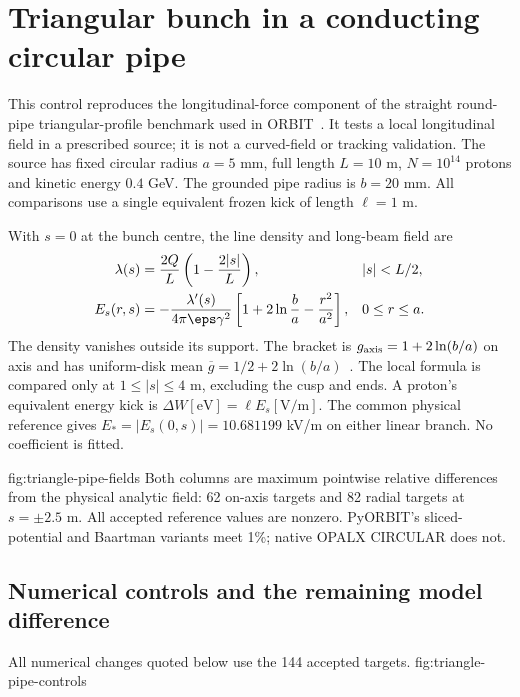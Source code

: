 \clearpage
\section{Triangular bunch in a conducting circular pipe}
\label{sec:triangle-pipe}
This control reproduces the longitudinal-force component of the straight
round-pipe triangular-profile benchmark used in ORBIT~\cite{orbit2006,pyorbit3triangle}. It tests a local
longitudinal field in a prescribed source; it is not a curved-field or tracking
validation. The source has fixed circular radius $a=5$ mm, full length
$L=10$ m, $N=10^{14}$ protons and kinetic energy $0.4$ GeV. The grounded
pipe radius is $b=20$ mm. All comparisons use a single equivalent frozen
kick of length $\ell=1$ m.

With $s=0$ at the bunch centre, the line density and long-beam field are
\begin{align}
 \lambda(s)&=\frac{2Q}{L}\left(1-\frac{2|s|}{L}\right),
   &&|s|<L/2,\\
 E_s(r,s)&=-\frac{\lambda'(s)}{4\pi\eps\gamma^2}
 \left[1+2\ln\frac ba-\frac{r^2}{a^2}\right],
   &&0\le r\le a.
 \label{eq:triangle-pipe}
\end{align}
The density vanishes outside its support. The bracket is $g_{\rm axis}
=1+2\ln(b/a)$ on axis and has uniform-disk mean
$\overline g=1/2+2\ln(b/a)$~\cite{baartman}. The local formula is compared
only at $1\le|s|\le4$ m, excluding the cusp and ends. A proton's equivalent
energy kick is $\Delta W[\mathrm{eV}]=\ell E_s[\mathrm{V/m}]$.
The common physical reference gives $E_*=|E_s(0,s)|=10.681199$ kV/m on
either linear branch. No coefficient is fitted.

{fig:triangle-pipe-fields}
Both columns are maximum pointwise relative differences from the physical
analytic field: 62 on-axis targets and 82 radial targets at $s=\pm2.5$ m.
All accepted reference values are nonzero. PyORBIT's sliced-potential and
Baartman variants meet 1\%; native OPALX CIRCULAR does not.

\clearpage
\subsection{Numerical controls and the remaining model difference}
All numerical changes quoted below use the 144 accepted targets.
{fig:triangle-pipe-controls}

